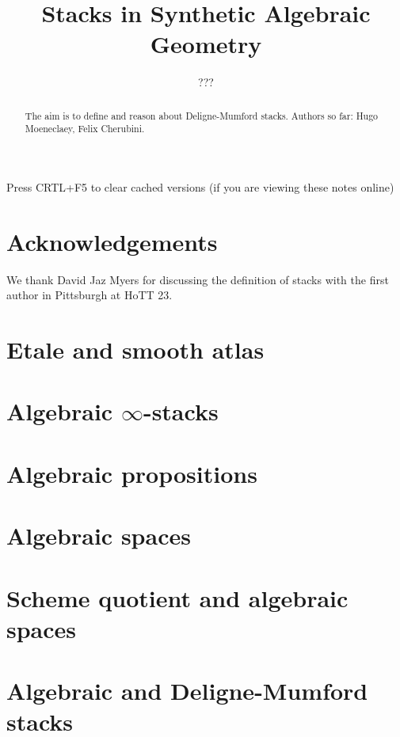 \documentclass{../util/zariski}
\title{Stacks in Synthetic Algebraic Geometry}
\author{???}
\begin{document}
\maketitle

\begin{center}
  \color{purple}
  \large{Press CRTL+F5 to clear cached versions}
  \large{(if you are viewing these notes online)}
\end{center}

\begin{abstract}
  The aim is to define and reason about Deligne-Mumford stacks.
  Authors so far: Hugo Moeneclaey, Felix Cherubini.
\end{abstract}

\section*{Acknowledgements}
We thank David Jaz Myers for discussing the definition of stacks with the first author in Pittsburgh at HoTT 23.

\tableofcontents

\section{Etale and smooth atlas}


\section{Algebraic $\infty$-stacks}


\section{Algebraic propositions}


\section{Algebraic spaces}


\section{Scheme quotient and algebraic spaces}


\section{Algebraic and Deligne-Mumford stacks}



\printindex

\printbibliography
\end{document}
